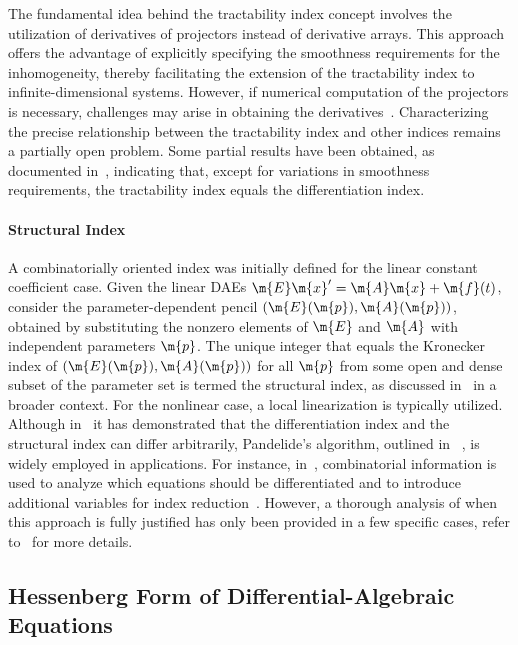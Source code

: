 The fundamental idea behind the tractability index concept involves the utilization of derivatives of projectors instead of derivative arrays. This approach offers the advantage of explicitly specifying the smoothness requirements for the inhomogeneity, thereby facilitating the extension of the tractability index to infinite-dimensional systems. However, if numerical computation of the projectors is necessary, challenges may arise in obtaining the derivatives~\cite{mehrmann2015index}. Characterizing the precise relationship between the tractability index and other indices remains a partially open problem. Some partial results have been obtained, as documented in~\cite{campbell1995index, campbell1995solvability, marz2005characterizing}, indicating that, except for variations in smoothness requirements, the tractability index equals the differentiation index.

\paragraph{Structural Index}

A combinatorially oriented index was initially defined for the linear constant coefficient case. Given the linear \acp{DAE} $\m{E}\m{x}^{\prime} = \m{A}\m{x} + \m{f}(t)$, consider the parameter-dependent pencil $(\m{E}(\m{p}), \m{A}(\m{p}))$, obtained by substituting the nonzero elements of $\m{E}$ and $\m{A}$ with independent parameters $\m{p}$. The unique integer that equals the Kronecker index of $(\m{E}(\m{p}), \m{A}(\m{p}))$ for all $\m{p}$ from some open and dense subset of the parameter set is termed the structural index, as discussed in~\cite{pantelides1988consistent, pryce2001simple} in a broader context. For the nonlinear case, a local linearization is typically utilized. Although in~\cite{reissig2000differential} it has demonstrated that the differentiation index and the structural index can differ arbitrarily, Pandelide's algorithm, outlined in ~\cite{pantelides1988consistent}, is widely employed in applications. For instance, in~\cite{unger1995structural}, combinatorial information is used to analyze which equations should be differentiated and to introduce additional variables for index reduction~\cite{mattsson1993index}. However, a thorough analysis of when this approach is fully justified has only been provided in a few specific cases, refer to~\cite{mehrmann2015index} for more details.

\subsection{Hessenberg Form of Differential-Algebraic Equations}

